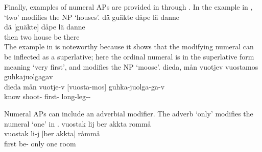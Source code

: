 Finally, examples of numeral APs are provided in  through . In the example in ,  ‘two’ modifies the NP  ‘houses’. %
\ea\label{APstructureEx5}%
\glll	dä guäkte dåpe lä danne\\
	dä {[guäkte]\subAP} dåpe lä danne \\
	then two house\BS{} be\BS{} there\\\nopagebreak
{}	
\z
The example in  %
is noteworthy because it shows that the modifying numeral can be inflected as a superlative; here the ordinal numeral  is in the superlative form  meaning ‘very first’, and modifies the NP  ‘moose’. 
\ea\label{APstructureEx6}%
\glll	dieda, mån vuotjev vuostamos guhkajuolgagav\\
	dieda mån vuotje-v {[vuosta-mos]\subAP} guhka-juolga-ga-v\\
	know\BS{}  shoot- first- long-leg--\\\nopagebreak
{}	%
\z

Numeral APs can include an adverbial modifier. The adverb  ‘only’ modifies the numeral  ‘one’ in .
\ea\label{APstructureEx7}%
\glll	vuostak lij ber akkta rommå\\
	vuostak li-j {[ber} {akkta]\subAP} råmmå\\
	first be- only one room\BS{}\\\nopagebreak
{}	
\z


